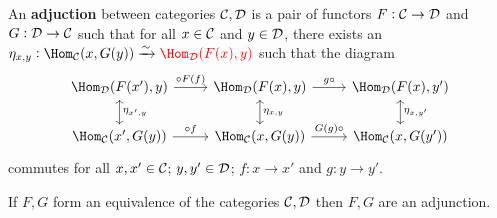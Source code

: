 \documentclass[../Year2.tex]{subfiles}
\begin{document}
\begin{definition}[Adjunction]
    An \textbf{adjuction} between categories $\mathcal{C},\mathcal{D}$ is a pair of functors $F:\mathcal{C}\rightarrow\mathcal{D}$ and $G:\mathcal{D}\rightarrow\mathcal{C}$ such that for all $x\in\mathcal{C}$ and $y\in\mathcal{D}$, there exists an $\eta_{x,y}:\Hom_\CCC(x,G(y))\xrightarrow{\sim}\textcolor{red}{\Hom_\DDD(F(x),y)}$ such that the diagram 
    \vspace{-10pt}
    \[
        \begin{tikzcd}
            \Hom_\DDD(F(x'),y) \arrow[d, leftrightarrow, "\eta_{x',y}"] \arrow[r, "\circ F(f)"] & 
            \Hom_\DDD(F(x),y) \arrow[d, leftrightarrow, "\eta_{x,y}"] \arrow[r, "g\circ"] & 
            \Hom_\DDD(F(x),y') \arrow[d, leftrightarrow, "\eta_{x,y'}"] \\
            \Hom_\CCC(x',G(y)) \arrow[r, "\circ f"] & 
            \Hom_\CCC(x,G(y)) \arrow[r, "G(g)\circ"] & 
            \Hom_\CCC(x,G(y'))
        \end{tikzcd}
    \] commutes for all $x,x'\in\mathcal{C}$; $y,y'\in\mathcal{D}$; $f:x\rightarrow x'$ and $g:y\rightarrow y'$.
\end{definition}

\begin{theorem}
    If $F,G$ form an equivalence of the categories $\mathcal{C},\mathcal{D}$ then $F,G$ are an adjunction.
\end{theorem}
\end{document}
